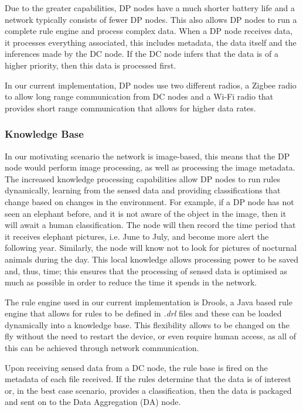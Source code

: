 	Due to the greater capabilities, DP nodes have a much shorter battery life and a network typically consists of fewer DP nodes. This also allows DP nodes to run a complete rule engine and process complex data. When a DP node receives data, it processes everything associated, this includes metadata, the data itself and the inferences made by the DC node. If the DC node infers that the data is of a higher priority, then this data is processed first.

	In our current implementation, DP nodes use two different radios, a Zigbee radio to allow long range communication from DC nodes and a Wi-Fi radio that provides short range communication that allows for higher data rates.

	\subsubsection{Knowledge Base}
	In our motivating scenario the network is image-based, this means that the DP node would perform image processing, as well as processing the image metadata. The increased knowledge processing capabilities allow DP nodes to run rules dynamically, learning from the sensed data and providing classifications that change based on changes in the environment. For example, if a DP node has not seen an elephant before, and it is not aware of the object in the image, then it will await a human classification. The node will then record the time period that it receives elephant pictures, i.e. June to July, and become more alert the following year. Similarly, the node will know not to look for pictures of nocturnal animals during the day. This local knowledge allows processing power to be saved and, thus, time; this ensures that the processing of sensed data is optimised as much as possible in order to reduce the time it spends in the network.
	
	The rule engine used in our current implementation is Drools, a Java based rule engine that allows for rules to be defined in \textit{.drl} files and these can be loaded dynamically into a knowledge base. This flexibility allows to be changed on the fly without the need to restart the device, or even require human access, as all of this can be achieved through network communication. 
	
	Upon receiving sensed data from a DC node, the rule base is fired on the metadata of each file received. If the rules determine that the data is of interest or, in the best case scenario, provides a classification, then the data is packaged and sent on to the Data Aggregation (DA) node.
	
